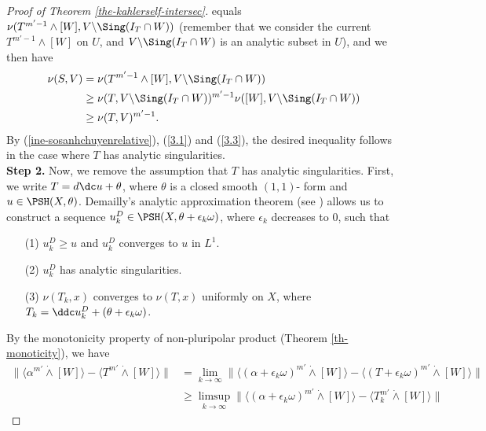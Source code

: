 \begin{proof}[Proof of Theorem \ref{the-kahlerself-intersec}]
        equals $\nu (T^{m'-1} \wedge [W], V \backslash \Sing(I_T \cap W))$ (remember that we consider the current $T^{m'-1} \wedge [W]$ on $U$, and  $V \backslash \Sing(I_T \cap W)$ is an analytic subset in $U$), and we then have
        \begin{align}
            \nu(S,V) &= \nu (T^{m'-1} \wedge [W], V \backslash \Sing(I_T \cap W)) \notag\\
            &\geq \nu(T,V \backslash \Sing(I_T \cap W))^{m'-1} \nu([W], V \backslash \Sing(I_T \cap W)) \notag\\
            &\geq \nu(T,V)^{m'-1}.\label{3.3}
        \end{align}
        By (\ref{ine-sosanhchuyenrelative}), (\ref{3.1})  and  (\ref{3.3}), the desired inequality follows in the case where $T$ has analytic singularities. 
        \\

        \noindent
        \textbf{Step 2.}
        Now, we remove the assumption that $T$ has analytic singularities. First, we write $T = d \dc u + \theta$, where $\theta$ is a closed smooth $(1,1)$- form and $u \in \PSH(X,\theta)$. Demailly's analytic approximation theorem (see \cite[Corollary 14.13]{Demailly_analyticmethod}) allows us to construct a sequence $u_{k}^{D} \in \PSH(X, \theta + \epsilon_{k} \omega)$, where $\epsilon_k$ decreases to $0$, such that 
        \begin{itemize}
            \item[(1)] $u_{k}^{D} \ge u$ and $u_k^D$ converges to $u$ in $L^1$.
            \item[(2)] $u_{k}^{D}$ has analytic singularities.
            \item[(3)] $\nu(T_k,x)$ converges to $\nu(T,x)$ uniformly on $X$, where $T_k = \ddc u^{D}_k + (\theta + \epsilon_k \omega)$.
        \end{itemize}

        By the monotonicity property of non-pluripolar product (Theorem \ref{th-monoticity}), we have 
        \begin{align} \label{ine0xapxiepsilonTk}
            \big\|  \langle \alpha^{m'} \dot{\wedge} [W]\rangle- \langle T^{m'} \dot{\wedge} [W] \rangle \big \| &= \lim_{k \to \infty} \big\|  \langle (\alpha+ \epsilon_k \omega)^{m'} \dot{\wedge} [W]\rangle- \langle (T+ \epsilon_k \omega)^{m'} \dot{\wedge} [W] \rangle \big \|\\
            \nonumber
            & \ge \limsup_{k\to \infty}\big\|  \langle (\alpha+ \epsilon_k \omega)^{m'} \dot{\wedge} [W]\rangle- \langle T_k^{m'} \dot{\wedge} [W] \rangle \big \|
        \end{align}


\end{proof}
